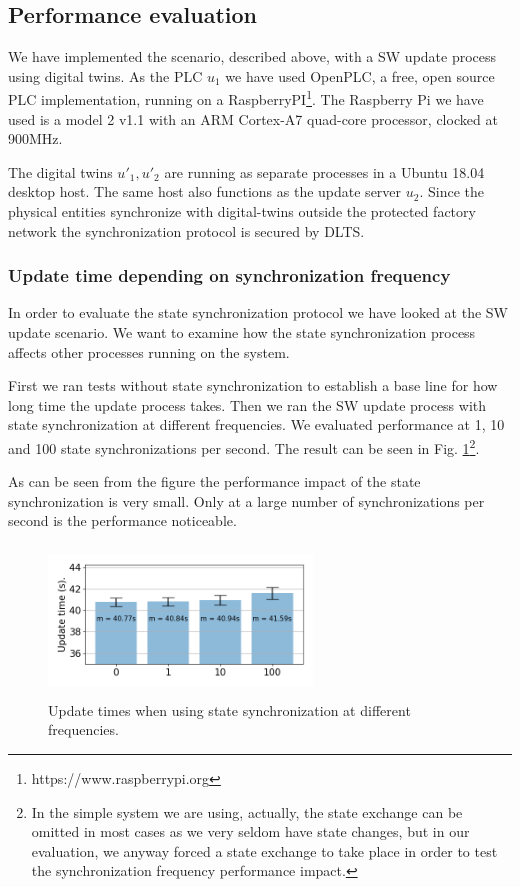 \vspace*{-0.15in}
\subsection{Performance evaluation}
We have implemented the scenario, described above, with a SW update process using digital twins. As the PLC $u_1$ we have used OpenPLC\cite{Alvares2014}, a free, open source PLC implementation, running on a RaspberryPI\footnote{https://www.raspberrypi.org }. The Raspberry Pi we have used is a model 2 v1.1 with an ARM Cortex-A7 quad-core processor, clocked at 900MHz.

The digital twins $u'_1, u'_2$ are running as separate processes in a Ubuntu 18.04 desktop host. The same host also functions as the update server $u_2$. Since the physical entities synchronize with digital-twins outside the protected factory network the synchronization protocol is secured by DLTS. 

\subsubsection{Update time depending on synchronization frequency}
In order to evaluate the state synchronization protocol we have looked at the SW update scenario. We want to examine how the state synchronization process affects other processes running on the system.

First we ran tests without state synchronization to establish a base line for how long time the update process takes. Then we ran the SW update process with state synchronization at different frequencies. We evaluated performance at 1, 10 and 100 state synchronizations per second. The result can be seen in Fig. \ref{figure:times}\footnote{In the simple system we are using, actually, the state exchange can be omitted in most cases as we very seldom have state changes, but in our evaluation, we anyway forced a state exchange to take place in order to test the synchronization frequency performance impact.}.

As can be seen from the figure the performance impact of the state synchronization is very small. Only at a large number of synchronizations per second is the performance noticeable.
\begin{figure}[ht]
\vspace*{-0.2in}
   \centering
    \includegraphics[height=4cm, width=7cm]{papers/digital-twin/images/FIG8_TII-19-1326}
    \vspace*{-0.15in}
    \caption{Update times when using state synchronization at different frequencies.}
    \label{figure:times}
\end{figure}

